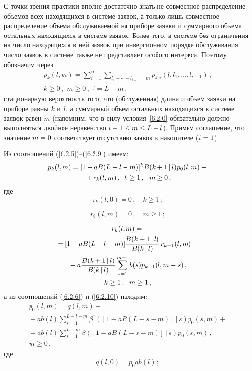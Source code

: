 \begin{multicols}{2}
С точки зрения практики вполне достаточно знать не
совместное распределение объемов всех находящихся в
системе заявок, а только лишь совместное распределение
объема обслуживаемой на приборе заявки и суммарного
объема остальных находящихся в сис\-те\-ме заявок.
Более того, в сис\-те\-ме без ограничения на чис\-ло
находящихся в ней заявок при инверсионном порядке
обслуживания чис\-ло
заявок в сис\-те\-ме также не представляет особого интереса.
Поэтому обозначим через
\begin{multline*}
p_{k}(l,m)
= \sum\limits_{i=1}^\infty
\sum\limits_{l_1+\cdots+l_{i-1}=m}
p_{k,i}(l,l_1,\ldots,l_{i-1})\,,
\\
 k\ge 0\,,\ \ m\ge 0\,,\ \ l=\overline{L-m}\,,
\end{multline*}
стационарную вероятность того, что (обслуженная) длина
и объем заявки на приборе равны $k$ и~$l$, а суммарный
объем остальных находящихся в сис\-те\-ме заявок равен $m$
(напомним, что в силу условия~\eqref{6.2.0} обязательно
должно выполняться двойное неравенство
$i-1\hm\le m \hm\le L-l$).
Примем соглашение, что значение $m\hm=0$ соответствует
отсутствию заявок в накопителе ($i\hm=1$).

Из соотношений (\ref{6.2.5})--(\ref{6.2.9}) имеем:
\begin{multline}
\label{6.2*.11}
p_{k}(l,m)
=[1 - a B(L-l-m)]^k
B(k+1\,\vert\,l) p_{0}(l,m)
+{}\\
{}+ r_{k}(l,m)\,,
\enskip
k \ge 1\,,\ \ m\ge 0\,,
\end{multline}
где
\begin{equation}
\label{6.2*.12}
r_{k}(l,0) = 0\,, \quad k \ge 1\,;
\end{equation}

\noindent
\begin{equation}
\label{6.2*.13}
r_{0}(l,m) = 0\,,
\quad m \ge 1\,;
\end{equation}

\vspace*{-9pt}

\noindent
\begin{multline}
r_{k}(l,m) ={}\\
{}=
[1 - a B(L-l-m)]
\displaystyle\frac{\displaystyle B(k+1\,|\,l)\mathstrut}{\displaystyle  B(k\,|\,l)\mathstrut}
\,r_{k-1}(l,m) +{}\\
{}+ a \displaystyle\frac{\displaystyle B(k+1\,|\,l) \mathstrut}{\displaystyle  B(k\,|\,l)\mathstrut}
\sum\limits_{s=1}^{m-1}
b(s) p_{k-1}(l,m-s)\,,
\\
 k\ge 1\,,
\ \ m \ge 1\,,
\label{6.2*.14}
\end{multline}
а из соотношений (\ref{6.2.6}) и (\ref{6.2.10}) находим:
\begin{multline}
p_{0}(l,m) =q(l,m) + {}\\
{}+ a b(l)
\sum\limits_{s=1}^{L-l-m}
\beta^*([1 - a B(L-s-m)]\,|\,s)
p_{0}(s,m)
 +{}
\\
{}+ a b(l) \sum\limits_{s=1}^{L-m}
\beta([1 - a B(L-s-m)]\,|\,s)
p_{0}(s,m)\,,
\\
m \ge 0\,,
\label{6.2*.15}
\end{multline}
где
\begin{equation}
\label{6.2*.16}
q(l,0) = p_0 a b(l) \,;
\end{equation}


\end{multicols}
